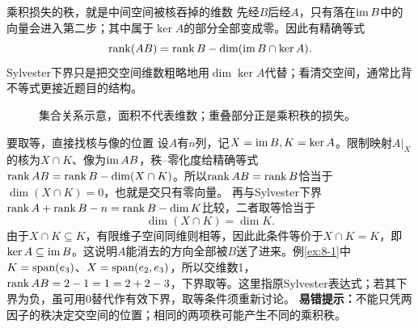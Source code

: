 \begin{insight}{乘积损失的秩，就是中间空间被核吞掉的维数}
先经$B$后经$A$，只有落在$\operatorname{im} B$中的向量会进入第二步；其中属于$\ker A$的部分全部变成零。因此有精确等式
\[\operatorname{rank}(AB)=\operatorname{rank} B-\dim(\operatorname{im} B\cap\ker A).
\]
Sylvester下界只是把交空间维数粗略地用$\dim\ker A$代替；看清交空间，通常比背不等式更接近题目的结构。
\end{insight}
\begin{figure}[H]\centering
{}
\caption{集合关系示意，面积不代表维数；重叠部分正是乘积秩的损失。}\label{fig:rank-intersection}
\end{figure}
\begin{clevertrick}{要取等，直接找核与像的位置}
设$A$有$n$列，记$X=\operatorname{im} B,K=\ker A$。限制映射$A|_X$的核为$X\cap K$、像为$\operatorname{im} AB$，秩--零化度给精确等式$\operatorname{rank} AB=\operatorname{rank} B-\dim(X\cap K)$。所以$\operatorname{rank} AB=\operatorname{rank} B$恰当于$\dim(X\cap K)=0$，也就是交只有零向量。
再与Sylvester下界$\operatorname{rank} A+\operatorname{rank} B-n=\operatorname{rank} B-\dim K$比较，二者取等恰当于
\[\dim(X\cap K)=\dim K.\]
由于$X\cap K\subseteq K$，有限维子空间同维则相等，因此此条件等价于$X\cap K=K$，即$\ker A\subseteq\operatorname{im} B$。这说明$A$能消去的方向全部被$B$送了进来。例\ref{ex:8-1}中$K=\operatorname{span}(e_3)$、$X=\operatorname{span}(e_2,e_3)$，所以交维数1，$\operatorname{rank} AB=2-1=1=2+2-3$，下界取等。这里指原Sylvester表达式；若其下界为负，虽可用0替代作有效下界，取等条件须重新讨论。
\textbf{易错提示：}不能只凭两因子的秩决定交空间的位置；相同的两项秩可能产生不同的乘积秩。
\end{clevertrick}
